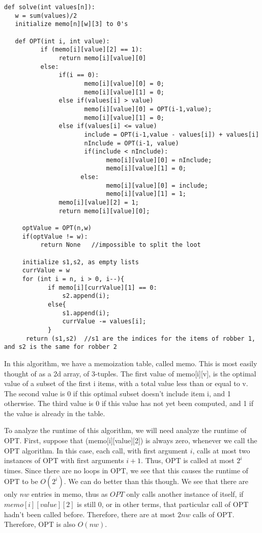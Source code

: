 \documentclass{article}
\begin{document}
\begin{verbatim}
def solve(int values[n]):
   w = sum(values)/2
   initialize memo[n][w][3] to 0's
   
   def OPT(int i, int value):
          if (memo[i][value][2] == 1):
               return memo[i][value][0]
          else:
               if(i == 0):
                      memo[i][value][0] = 0;
                      memo[i][value][1] = 0;
               else if(values[i] > value)
                      memo[i][value][0] = OPT(i-1,value);
                      memo[i][value][1] = 0;
               else if(values[i] <= value)
                      include = OPT(i-1,value - values[i]) + values[i]
                      nInclude = OPT(i-1, value)
                      if(include < nInclude):
                            memo[i][value][0] = nInclude;
                            memo[i][value][1] = 0;
                     else:
                            memo[i][value][0] = include;
                            memo[i][value][1] = 1;
               memo[i][value][2] = 1;
               return memo[i][value][0];

     optValue = OPT(n,w)
     if(optValue != w):
          return None   //impossible to split the loot

     initialize s1,s2, as empty lists
     currValue = w
     for (int i = n, i > 0, i--){
            if memo[i][currValue][1] == 0:
                s2.append(i);
            else{
                s1.append(i);
                currValue -= values[i];
            }
      return (s1,s2)  //s1 are the indices for the items of robber 1, and s2 is the same for robber 2

\end{verbatim}

In this algorithm, we have a memoization table, called memo.  This is most easily thought of as a 2d array, of 3-tuples.  The first value of memo[i][v], is the optimal value of a subset of the first i items, with a total value less than or equal to v.  The second value is 0 if this optimal subset doesn't include item i, and 1 otherwise.  The third value is 0 if this value has not yet been computed, and 1 if the value is already in the table.

To analyze the runtime of this algorithm, we will need analyze the runtime of OPT.  First, suppose that (memo[i][value][2]) is always zero, whenever we call the OPT algorithm.  In this case, each call, with first argument $i$, calls at most two instances of OPT with first arguments $i+1$.  Thus, OPT is called at most $2^i$ times.  Since there are no loops in OPT, we see that this causes the runtime of OPT to be $O(2^i)$.  We can do better than this though.  We see that there are only $nw$ entries in memo, thus as $OPT$ only calls another instance of itself, if $memo[i][value][2]$ is still 0, or in other terms, that particular call of OPT hadn't been called before.  Therefore, there are at most $2nw$ calls of OPT.  Therefore, OPT is also $O(nw)$.
\end{document}
